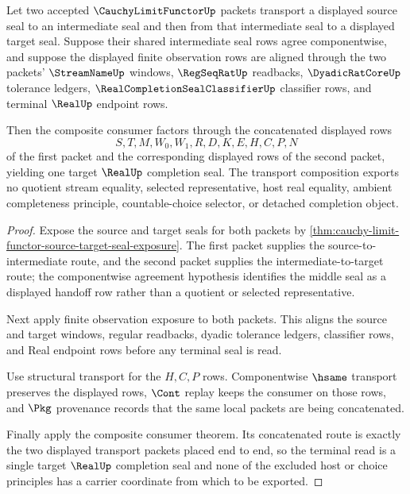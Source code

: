 \begin{theorem}
\label{thm:cauchy-limit-functor-transport-composition}
Let two accepted $\CauchyLimitFunctorUp$ packets transport a displayed source seal to an intermediate seal and then from that intermediate seal to a displayed target seal. Suppose their shared intermediate seal rows agree componentwise, and suppose the displayed finite observation rows are aligned through the two packets' $\StreamNameUp$ windows, $\RegSeqRatUp$ readbacks, $\DyadicRatCoreUp$ tolerance ledgers, $\RealCompletionSealClassifierUp$ classifier rows, and terminal $\RealUp$ endpoint rows.

Then the composite consumer factors through the concatenated displayed rows
$$
S,T,M,W_0,W_1,R,D,K,E,H,C,P,N
$$
of the first packet and the corresponding displayed rows of the second packet, yielding one target $\RealUp$ completion seal. The transport composition exports no quotient stream equality, selected representative, host real equality, ambient completeness principle, countable-choice selector, or detached completion object.
\end{theorem}
\begin{proof}
Expose the source and target seals for both packets by \autoref{thm:cauchy-limit-functor-source-target-seal-exposure}. The first packet supplies the source-to-intermediate route, and the second packet supplies the intermediate-to-target route; the componentwise agreement hypothesis identifies the middle seal as a displayed handoff row rather than a quotient or selected representative.

Next apply finite observation exposure to both packets. This aligns the source and target windows, regular readbacks, dyadic tolerance ledgers, classifier rows, and Real endpoint rows before any terminal seal is read.

Use structural transport for the $H,C,P$ rows. Componentwise $\hsame$ transport preserves the displayed rows, $\Cont$ replay keeps the consumer on those rows, and $\Pkg$ provenance records that the same local packets are being concatenated.

Finally apply the composite consumer theorem. Its concatenated route is exactly the two displayed transport packets placed end to end, so the terminal read is a single target $\RealUp$ completion seal and none of the excluded host or choice principles has a carrier coordinate from which to be exported.
\end{proof}


